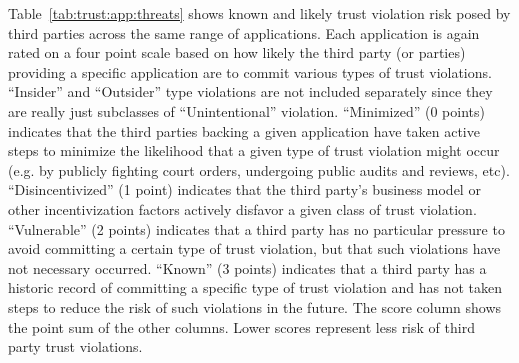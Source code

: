 Table~\ref{tab:trust:app:threats} shows known and likely trust
violation risk posed by third parties across the same range of
applications. Each application is again rated on a four point scale
based on how likely the third party (or parties) providing a specific
application are to commit various types of trust
violations. ``Insider'' and ``Outsider'' type violations are not
included separately since they are really just subclasses of
``Unintentional'' violation. ``Minimized'' (0 points) indicates that
the third parties backing a given application have taken active steps
to minimize the likelihood that a given type of trust violation might
occur (e.g. by publicly fighting court orders, undergoing public
audits and reviews, etc). ``Disincentivized'' (1 point) indicates that
the third party's business model or other incentivization factors
actively disfavor a given class of trust violation. ``Vulnerable'' (2
points) indicates that a third party has no particular pressure to
avoid committing a certain type of trust violation, but that such
violations have not necessary occurred. ``Known'' (3 points) indicates
that a third party has a historic record of committing a specific type
of trust violation and has not taken steps to reduce the risk of such
violations in the future. The score column shows the point sum of the
other columns. Lower scores represent less risk of third party trust
violations.


